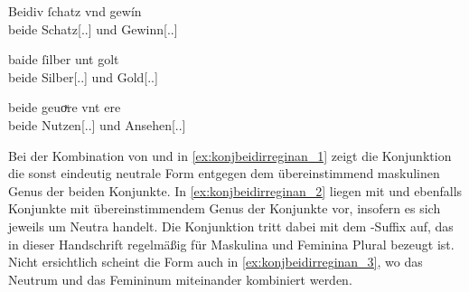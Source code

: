 \begin{exe}
\ex \label{ex:konjbeidirreginan}
	\begin{xlist}
	\ex \gll Beidiv ſchatz vnd gewín \\
			beide Schatz[\Acc.\Sg.\MascI] und Gewinn[\Acc.\Sg.\MascI] \\
		\begin{taggedline}{\parencites[\pno~29vb,41]{kc:VB}[vgl.][6112]{schroeder1895}}
		\trans {}
		\end{taggedline}
		\label{ex:konjbeidirreginan_1}

	\ex \gll baide ſilber unt golt \\
			beide Silber[\Acc.\Sg.\NeutI] und Gold[\Acc.\Sg.\NeutI] \\
		\begin{taggedline}{\parencites[\pno~68rb,43]{kc:A1}[vgl.][16012]{schroeder1895}}
		\trans {}
		\end{taggedline}
		\label{ex:konjbeidirreginan_2}

	\ex \gll beide geuoͮre vnt ere \\
			beide Nutzen[\Acc.\Sg.\NeutI] und Ansehen[\Acc.\Sg.\FemI] \\
		\begin{taggedline}{\parencites[\pno~4ra,16--17]{kc:A1}[vgl.][772]{schroeder1895}}
		\trans {}
		\end{taggedline}
		\label{ex:konjbeidirreginan_3}
	\end{xlist}
\end{exe}

Bei der Kombination von   und 
 in \cref{ex:konjbeidirreginan_1} zeigt die Konjunktion die sonst
eindeutig neutrale Form entgegen dem übereinstimmend maskulinen Genus der
beiden Konjunkte. In \cref{ex:konjbeidirreginan_2} liegen mit 
 und   ebenfalls Konjunkte mit
übereinstimmendem Genus der Konjunkte vor, insofern es sich jeweils um Neutra
handelt. Die Konjunktion tritt dabei mit dem -Suffix auf, das in dieser
Handschrift regelmäßig für Maskulina und Feminina Plural bezeugt ist. Nicht
ersichtlich scheint die Form  auch in \cref{ex:konjbeidirreginan_3},
wo das Neutrum   und das Femininum 
 miteinander kombiniert werden.

